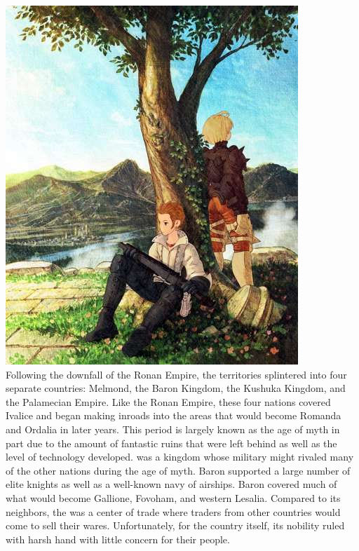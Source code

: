 %
\ofpar
\includegraphics[width=\columnwidth]{./art/worldbook/tree.jpg}
\ofrow
%
\\
Following the downfall of the Ronan Empire, the territories splintered into four separate countries: Melmond, the Baron Kingdom, the Kushuka Kingdom, and the Palamecian Empire. 
Like the Ronan Empire, these four nations covered Ivalice and began making inroads into the areas that would become Romanda and Ordalia in later years. 
This period is largely known as the age of myth in part due to the amount of fantastic ruins that were left behind as well as the level of technology developed.
 was a kingdom whose military might rivaled many of the other nations during the age of myth. 
Baron supported a large number of elite knights as well as a well-known navy of airships. 
Baron covered much of what would become Gallione, Fovoham, and western Lesalia.  
Compared to its neighbors, the  was a center of trade where traders from other countries would come to sell their wares. 
Unfortunately, for the country itself, its nobility ruled with harsh hand with little concern for their people.
